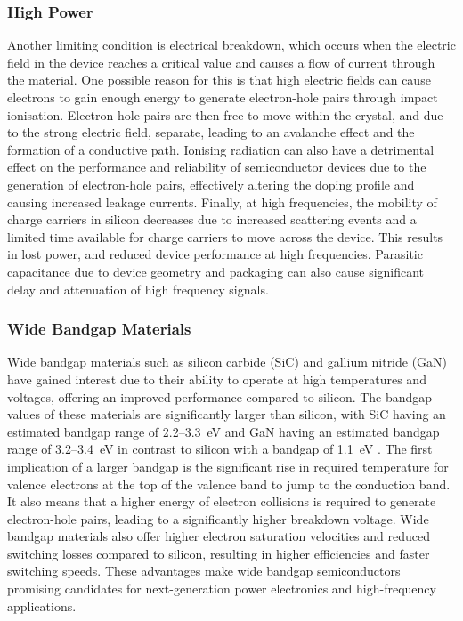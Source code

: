 \begin{refsection}
\subsubsection{High Power}
Another limiting condition is electrical breakdown, which occurs when the electric field in the device reaches a critical value and causes a flow of current through the material. One possible reason for this is that high electric fields can cause electrons to gain enough energy to generate electron-hole pairs through impact ionisation. Electron-hole pairs are then free to move within the crystal, and due to the strong electric field, separate, leading to an avalanche effect and the formation of a conductive path. Ionising radiation can also have a detrimental effect on the performance and reliability of semiconductor devices due to the generation of electron-hole pairs, effectively altering the doping profile and causing increased leakage currents. Finally, at high frequencies, the mobility of charge carriers in silicon decreases due to increased scattering events and a limited time available for charge carriers to move across the device. This results in lost power, and reduced device performance at high frequencies. Parasitic capacitance due to device geometry and packaging can also cause significant delay and attenuation of high frequency signals.

\subsubsection{Wide Bandgap Materials}
Wide bandgap materials such as silicon carbide (SiC) and gallium nitride (GaN) have gained interest due to their ability to operate at high temperatures and voltages, offering an improved performance compared to silicon. The bandgap values of these materials are significantly larger than silicon, with SiC having an estimated bandgap range of 2.2--3.3~\si{\electronvolt} and GaN having an estimated bandgap range of 3.2--3.4~\si{\electronvolt} in contrast to silicon with a bandgap of 1.1~\si{\electronvolt} \cite{sze2006}. The first implication of a larger bandgap is the significant rise in required temperature for valence electrons at the top of the valence band to jump to the conduction band. It also means that a higher energy of electron collisions is required to generate electron-hole pairs, leading to a significantly higher breakdown voltage. Wide bandgap materials also offer higher electron saturation velocities and reduced switching losses compared to silicon, resulting in higher efficiencies and faster switching speeds. These advantages make wide bandgap semiconductors promising candidates for next-generation power electronics and high-frequency applications.


\end{refsection}
